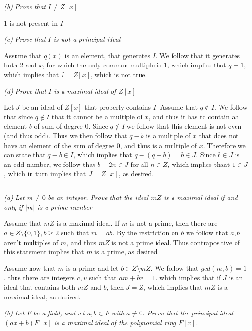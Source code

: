 \documentclass[11pt,oneside,titlepage]{book}
\newcommand{\set}[1]{\{ #1 \}}
\begin{document}
\textit{(b) Prove that $I \neq Z[x]$}

$1$ is not present in $I$

\textit{(c) Prove that $I$ is not a principal ideal}

Assume that $q(x)$ is an element, that generates $I$. We follow that it
generates both $2$ and $x$, for which the only common multiple is $1$,
which implies that $q = 1$, which implies that $I = Z[x]$, which is
not true.

\textit{(d) Prove that $I$ is a maximal ideal of $Z[x]$}

Let $J$ be an ideal of $Z[x]$ that properly contains $I$.  Assume that
$q \notin I$. We follow that since $q \notin I$ that it cannot be a
multiple of $x$, and thus it has to contain an element $b$ of sum of
degree $0$. Since $q \notin I$ we follow that this element is not even
(and thus odd). Thus we then follow that $q - b$ is a multiple of $x$
that does not have an element of the sum of degree $0$, and thus is a
multiple of $x$. Therefore we can state that $q - b \in I$, which
implies that $q - (q - b) = b \in J$. Since $b \in J$ is an odd
number, we follow that $b - 2n \in J$ for all $n \in Z$, which implies
thaat $1 \in J$, which in turn implies that $J = Z[x]$, as desired.

\subsection{}

\textit{(a) Let $m \neq 0$ be an integer. Prove that the ideal $mZ$ is
a maximal ideal if and only if $|m|$ is a prime number}

Assume that $mZ$ is a maximal ideal. If $m$ is not a prime, then there are
$a \in Z \setminus \set{0, 1}, b \geq 2$ such that $m = ab$. By the restriction on
$b$ we follow that $a, b$ aren't multiples of $m$, and thus $mZ$ is not a prime ideal.
Thus contrapositive of this statement implies that $m$ is a prime, as desired.

Assume now that $m$ is a prime and let $b \in Z \setminus mZ$. We
follow that $gcd(m, b) = 1$, thus there are integers $a, v$ such that
$am + bv = 1$, which implies that if $J$ is an ideal that contains both $mZ$ and $b$,
then $J = Z$, which implies that $mZ$ is a maximal ideal, as desired.

\textit{(b) Let $F$ be a field, and let $a, b \in F$ with $a \neq
  0$. Prove that the principal ideal $(ax + b)F[x]$ is a maximal ideal
  of the polynomial ring $F[x]$.}
\end{document}
